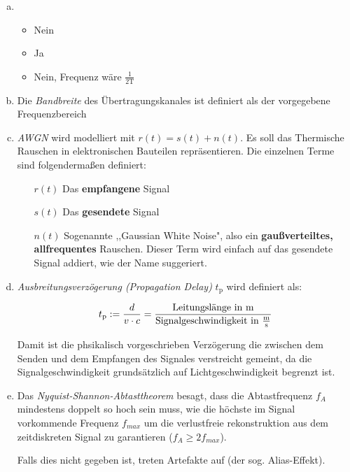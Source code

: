 \begin{enumerate}[a)]

	\item 
	
	\begin{itemize}
	
		\item Nein
		\item Ja
		\item Nein, Frequenz wäre $\frac{1}{2\text{T}}$
	
	\end{itemize}

	\item Die \emph{Bandbreite} des Übertragungskanales ist definiert als der vorgegebene Frequenzbereich
	
	\item \emph{AWGN} wird modelliert mit $r(t) = s(t) + n(t)$. Es soll das Thermische Rauschen in elektronischen Bauteilen repräsentieren. Die einzelnen Terme sind folgendermaßen definiert:
	
	\begin{itemize}
	
		\item[$r(t)$] Das \textbf{empfangene} Signal
		\item[$s(t)$] Das \textbf{gesendete} Signal
		\item[$n(t)$] Sogenannte ,,Gaussian White Noise", also ein \textbf{gaußverteiltes, allfrequentes} Rauschen. Dieser Term wird einfach auf das gesendete Signal addiert, wie der Name suggeriert.
		
		
	\end{itemize}		
	
	
	\item \emph{Ausbreitungsverzögerung (Propagation Delay)} $t_{\text{p}}$ wird definiert als:
	
		$$ 
			t_{\text{p}} := \frac{d}{v \cdot c} = 
			\frac{\text{Leitungslänge in m}}{\text{Signalgeschwindigkeit in $\frac{\text{m}}{\text{s}}$}} 
		$$
		
		Damit ist die phsikalisch vorgeschrieben Verzögerung die zwischen dem Senden und dem Empfangen des Signales verstreicht gemeint, da die Signalgeschwindigkeit grundsätzlich auf Lichtgeschwindigkeit begrenzt ist.
	
	\item Das \emph{Nyquist-Shannon-Abtasttheorem} besagt, dass die Abtastfrequenz $f_A$ mindestens doppelt so hoch sein muss, wie die höchste im Signal vorkommende Frequenz $f_{max}$ um die verlustfreie rekonstruktion aus dem zeitdiskreten Signal zu garantieren ($f_A \geq 2f_{max}$).
	
	\bigskip
	
	Falls dies nicht gegeben ist, treten Artefakte auf (der sog. Alias-Effekt).
	
\end{enumerate}


\vfill

